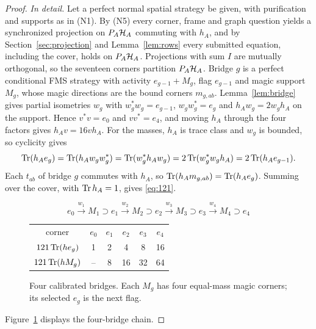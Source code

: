 \begin{proof}
\emph{In detail.} Let a perfect normal spatial strategy be given, with purification and supports as in (N1). By (N5) every corner, frame and graph question yields a synchronized projection on $P_A\mathcal H_A$ commuting with $h_A$, and by Section~\ref{sec:projection} and Lemma~\ref{lem:rows} every submitted equation, including the cover, holds on $P_A\mathcal H_A$. Projections with sum $I$ are mutually orthogonal, so the seventeen corners partition $P_A\mathcal H_A$. Bridge $g$ is a perfect conditional FMS strategy with activity $e_{g-1}+M_g$, flag $e_{g-1}$ and magic support $M_g$, whose magic directions are the bound corners $m_{g,ab}$. Lemma~\ref{lem:bridge} gives partial isometries $w_g$ with $w_g^*w_g=e_{g-1}$, $w_gw_g^*=e_g$ and $h_Aw_g=2w_gh_A$ on the support. Hence $v^*v=e_0$ and $vv^*=e_4$, and moving $h_A$ through the four factors gives $h_Av=16vh_A$. For the masses, $h_A$ is trace class and $w_g$ is bounded, so cyclicity gives
\[
 \operatorname{Tr}(h_Ae_g)=\operatorname{Tr}(h_Aw_gw_g^*)=\operatorname{Tr}(w_g^*h_Aw_g)=2\operatorname{Tr}(w_g^*w_gh_A)=2\operatorname{Tr}(h_Ae_{g-1}).
\]
Each $t_{ab}$ of bridge $g$ commutes with $h_A$, so $\operatorname{Tr}(h_Am_{g,ab})=\operatorname{Tr}(h_Ae_g)$. Summing over the cover, with $\operatorname{Tr} h_A=1$, gives \eqref{eq:121}.
\begin{figure}[ht]
\centering\small
\[
 e_0\xrightarrow{w_1}\boxed{M_1\supset e_1}
 \xrightarrow{w_2}\boxed{M_2\supset e_2}
 \xrightarrow{w_3}\boxed{M_3\supset e_3}
 \xrightarrow{w_4}\boxed{M_4\supset e_4}
\]
\begin{tabular}{@{}c|ccccc@{}}
corner & $e_0$&$e_1$&$e_2$&$e_3$&$e_4$\\
$121\operatorname{Tr}(he_g)$&1&2&4&8&16\\
$121\operatorname{Tr}(hM_g)$&--&8&16&32&64
\end{tabular}
\caption{Four calibrated bridges. Each $M_g$ has four equal-mass magic
corners; its selected $e_g$ is the next flag.}\label{fig:chain}
\end{figure}


Figure~\ref{fig:chain} displays the four-bridge chain.


\end{proof}
